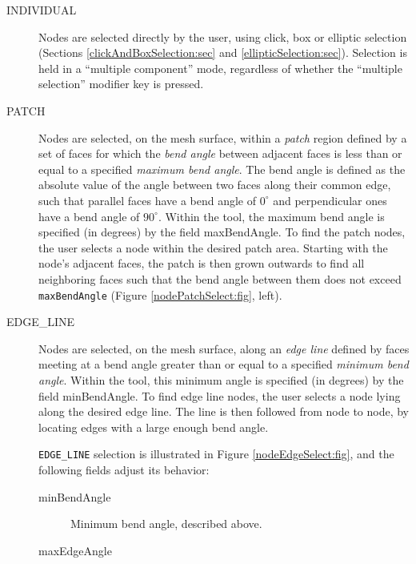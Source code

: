 \documentclass{article}
\begin{document}
\begin{description}

\item[INDIVIDUAL]\mbox{}

Nodes are selected directly by the user, using click, box or elliptic
selection (Sections \ref{clickAndBoxSelection:sec} and
\ref{ellipticSelection:sec}). Selection is held in a ``multiple
component'' mode, regardless of whether the ``multiple selection''
modifier key is pressed.

\item[PATCH]\mbox{}

Nodes are selected, on the mesh surface, within a {\it patch} region
defined by a set of faces for which the {\it bend angle} between
adjacent faces is less than or equal to a specified {\it maximum bend
angle}. The bend angle is defined as the absolute value of the angle
between two faces along their common edge, such that parallel faces
have a bend angle of $0^\circ$ and perpendicular ones have a bend
angle of $90^\circ$.  Within the tool, the maximum bend angle is
specified (in degrees) by the field {\sf maxBendAngle}. To find the
patch nodes, the user selects a node within the desired patch
area. Starting with the node's adjacent faces, the patch is then grown
outwards to find all neighboring faces such that the bend angle
between them does not exceed {\tt maxBendAngle} (Figure
\ref{nodePatchSelect:fig}, left).

\item[EDGE\_LINE]\mbox{}

Nodes are selected, on the mesh surface, along an {\it edge line}
defined by faces meeting at a bend angle greater than or equal to a
specified {\it minimum bend angle}.  Within the tool, this minimum
angle is specified (in degrees) by the field {\sf minBendAngle}. To
find edge line nodes, the user selects a node lying along the desired
edge line. The line is then followed from node to node, by locating
edges with a large enough bend angle.

{\tt EDGE\_LINE} selection is illustrated in Figure
\ref{nodeEdgeSelect:fig}, and the following fields adjust
its behavior:

\begin{description}

\item[{\sf minBendAngle}]\mbox{}

Minimum bend angle, described above.

\item[{\sf maxEdgeAngle}]\mbox{}


\end{description}
\end{description}
\end{document}
